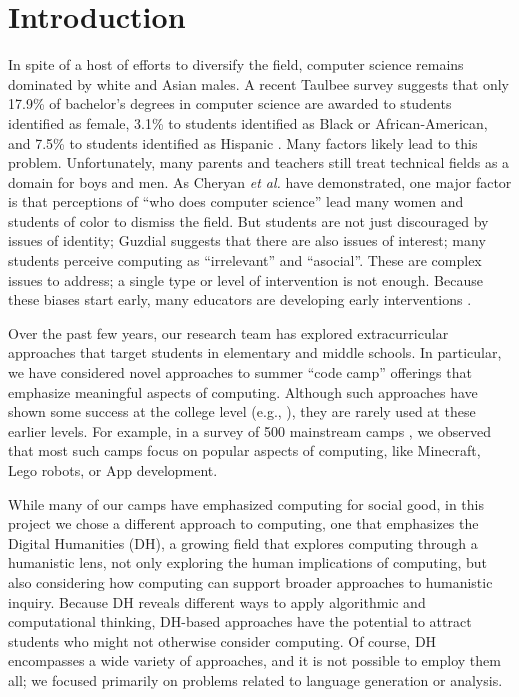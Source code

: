 \section{Introduction}

In spite of a host of efforts to diversify the field, computer
science remains dominated by white and Asian males.  A
recent Taulbee survey suggests that only 17.9\%
of bachelor's degrees in computer science are awarded to students
identified as female, 3.1\% to students identified as Black or
African-American, and 7.5\% to students identified as Hispanic
\cite{Taulbee2016}.  Many factors likely lead to this
problem.  Unfortunately, many parents and teachers still treat
technical fields as a domain for boys and men.  As Cheryan \textit{et al.}
\cite{Cheryan2010} have demonstrated, one major factor is that
perceptions of ``who does computer science'' lead many women and
students of color to dismiss the field.  But students are not
just discouraged by issues of identity; Guzdial \cite{Guzdial2009}
suggests that there are also issues of interest; many students
perceive computing as ``irrelevant'' and ``asocial''.
These are complex issues to address; a single type or level of
intervention is not enough.  Because these biases start early,
many educators are developing early interventions
\cite{McGill2015,Decker2016}.  

Over the past few years, our research team has explored extracurricular
approaches that target students in elementary and middle schools.
In particular, we have considered novel approaches to summer ``code
camp'' offerings that emphasize meaningful aspects of computing.
Although such approaches have shown some success at the college
level (e.g., \cite{Goldweber2013, Goldweber2018, Wolz2011}), they are rarely
used at these earlier levels.  For example, in a survey of 500
mainstream camps \cite{DeWitt2017}, we observed that most such camps
focus on popular aspects of computing, like Minecraft, Lego robots,
or App development.

While many of our camps have emphasized computing for social good,
in this project we chose a different approach to computing, one
that emphasizes the Digital Humanities (DH), a growing field 
that explores computing through a humanistic lens, not only exploring
the human implications of computing, but also considering how
computing can support broader approaches to humanistic inquiry.
Because DH reveals different ways to apply algorithmic and computational
thinking, DH-based approaches have the potential to attract students
who might not otherwise consider computing.  Of course, DH encompasses
a wide variety of approaches, and it is not possible to employ them
all; we focused primarily on problems related to language generation
or analysis.

